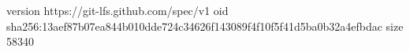 version https://git-lfs.github.com/spec/v1
oid sha256:13aef87b07ea844b010dde724c34626f143089f4f10f5f41d5ba0b32a4efbdac
size 58340
